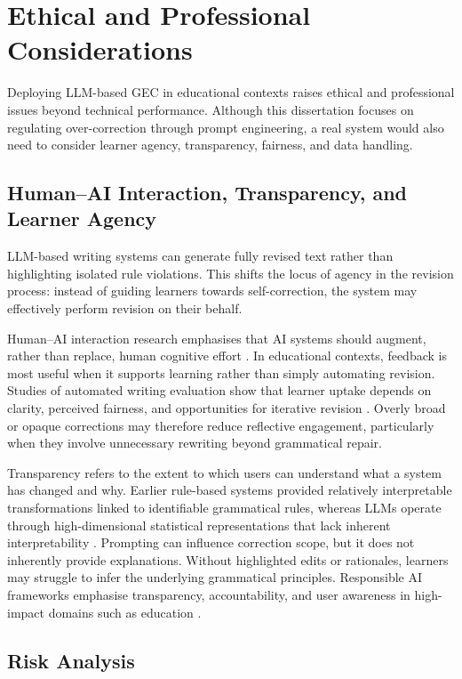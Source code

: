 \section{Ethical and Professional Considerations}

Deploying LLM-based GEC in educational contexts raises ethical and professional issues beyond technical performance. Although this dissertation focuses on regulating over-correction through prompt engineering, a real system would also need to consider learner agency, transparency, fairness, and data handling.

\subsection{Human--AI Interaction, Transparency, and Learner Agency}

LLM-based writing systems can generate fully revised text rather than highlighting isolated rule violations. This shifts the locus of agency in the revision process: instead of guiding learners towards self-correction, the system may effectively perform revision on their behalf.

Human--AI interaction research emphasises that AI systems should augment, rather than replace, human cognitive effort \cite{amershi2019guidelines}. In educational contexts, feedback is most useful when it supports learning rather than simply automating revision. Studies of automated writing evaluation show that learner uptake depends on clarity, perceived fairness, and opportunities for iterative revision \cite{ke2019automated}. Overly broad or opaque corrections may therefore reduce reflective engagement, particularly when they involve unnecessary rewriting beyond grammatical repair.

Transparency refers to the extent to which users can understand what a system has changed and why. Earlier rule-based systems provided relatively interpretable transformations linked to identifiable grammatical rules, whereas LLMs operate through high-dimensional statistical representations that lack inherent interpretability \cite{NIPS2017_3f5ee243}. Prompting can influence correction scope, but it does not inherently provide explanations. Without highlighted edits or rationales, learners may struggle to infer the underlying grammatical principles. Responsible AI frameworks emphasise transparency, accountability, and user awareness in high-impact domains such as education \cite{floridi2018ai4people}.

\subsection{Risk Analysis}

